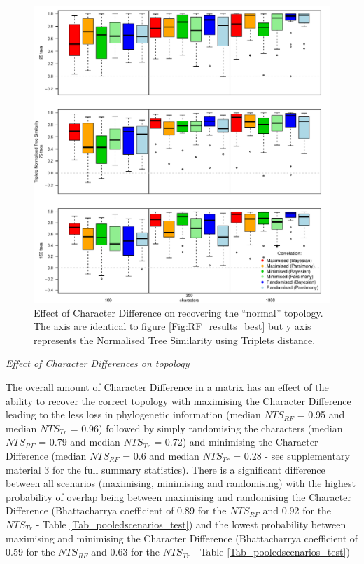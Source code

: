 \documentclass[12pt,letterpaper]{article}
\renewcommand{\subsection}[1]{%
\bigskip
\begin{center}
\begin{large}
\normalfont\itshape #1
\end{large}
\end{center}}
\begin{document}
\begin{figure}[!htbp]
\centering
   \includegraphics[width=1\textwidth]{Figures/Tr_results_best.pdf} %
\caption{Effect of Character Difference on recovering the ``normal'' topology. The axis are identical to figure \ref{Fig:RF_results_best} but y axis represents the Normalised Tree Similarity using Triplets distance.}
\label{Fig:Tr_results_best}
\end{figure}

\subsection{Effect of Character Differences on topology}

The overall amount of Character Difference in a matrix has an effect of the ability to recover the correct topology with maximising the Character Difference leading to the less loss in phylogenetic information (median $NTS_{RF}$ = 0.95 and median $NTS_{Tr}$ = 0.96) followed by simply randomising the characters (median $NTS_{RF}$ = 0.79 and median $NTS_{Tr}$ = 0.72) and minimising the Character Difference (median $NTS_{RF}$ = 0.6 and median $NTS_{Tr}$ = 0.28 - see supplementary material 3 for the full summary statistics).
There is a significant difference between all scenarios (maximising, minimising and randomising) with the highest probability of overlap being between maximising and randomising the Character Difference (Bhattacharrya coefficient of 0.89 for the $NTS_{RF}$ and 0.92 for the $NTS_{Tr}$ - Table \ref{Tab_pooledscenarios_test}) and the lowest probability between maximising and minimising the Character Difference (Bhattacharrya coefficient of 0.59 for the $NTS_{RF}$ and 0.63 for the $NTS_{Tr}$ - Table \ref{Tab_pooledscenarios_test})
\end{document}
